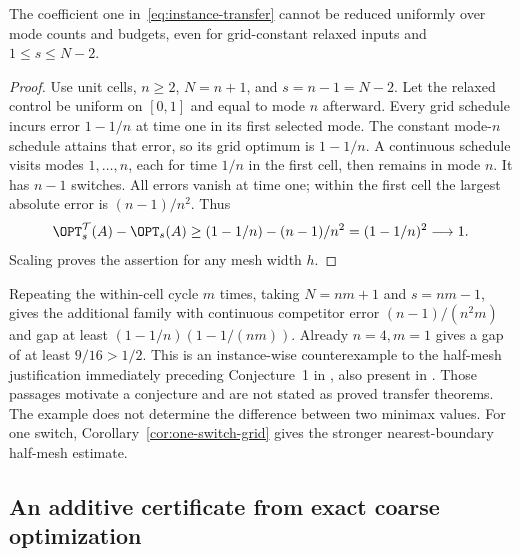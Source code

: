 \begin{proposition}\label{prop:transfer-sharpness}
The coefficient one in~\eqref{eq:instance-transfer} cannot be reduced
uniformly over mode counts and budgets, even for grid-constant relaxed inputs
and $1\le s\le N-2$.
\end{proposition}
\begin{proof}
Use unit cells, $n\ge2$, $N=n+1$, and $s=n-1=N-2$. Let the relaxed
control be uniform on $[0,1]$ and equal to mode $n$ afterward. Every grid
schedule incurs error $1-1/n$ at time one in its first selected mode. The
constant mode-$n$ schedule attains that error, so its grid optimum is
$1-1/n$. A continuous schedule visits modes $1,\ldots,n$, each for time
$1/n$ in the first cell, then remains in mode $n$. It has $n-1$ switches.
All errors vanish at time one; within the first cell the largest absolute
error is $(n-1)/n^2$. Thus
\[
 \OPT_s^{\mathcal T}(A)-\OPT_s(A)
 \ge(1-1/n)-(n-1)/n^2=(1-1/n)^2\longrightarrow1.
\]
Scaling proves the assertion for any mesh width $h$.
\end{proof}

Repeating the within-cell cycle $m$ times, taking $N=nm+1$ and
$s=nm-1$, gives the additional family with continuous competitor error
$(n-1)/(n^2m)$ and gap at least $(1-1/n)(1-1/(nm))$.
Already $n=4,m=1$ gives a gap of at least $9/16>1/2$.
This is an instance-wise counterexample to the half-mesh justification
immediately preceding Conjecture~1 in
\citet[p.~615]{sager-zeile2021}, also present in
\citet[p.~139]{zeile2021thesis}. Those passages motivate a conjecture and
are not stated as proved transfer theorems. The example does not determine
the difference between two minimax values. For one switch,
Corollary~\ref{cor:one-switch-grid} gives the stronger nearest-boundary
half-mesh estimate.

\subsection{An additive certificate from exact coarse optimization}

